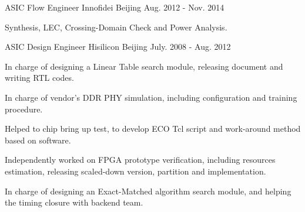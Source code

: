 \begin{cventries}

\cventry
{ASIC Flow Engineer} %
{Innofidei} %
{Beijing} %
{Aug. 2012 - Nov. 2014} %
{ %
\begin{cvitems}
\item {Synthesis, LEC, Crossing-Domain Check and Power Analysis.}
\end{cvitems}
}


\cventry
{ASIC Design Engineer} %
{Hisilicon} %
{Beijing} %
{July. 2008 - Aug. 2012} %
{ %
\begin{cvitems}
\item {In charge of designing a Linear Table search module, releasing document and writing RTL codes.}
\item {In charge of vendor's DDR PHY simulation, including configuration and training procedure.}
\item {Helped to chip bring up test, to develop ECO Tcl script and work-around method based on software.}
\item {Independently worked on FPGA prototype verification, including resources estimation, releasing scaled-down version, partition and implementation.}
\item {In charge of designing an Exact-Matched algorithm search module, and helping the timing closure with backend team.}
\end{cvitems} 
}


\end{cventries}